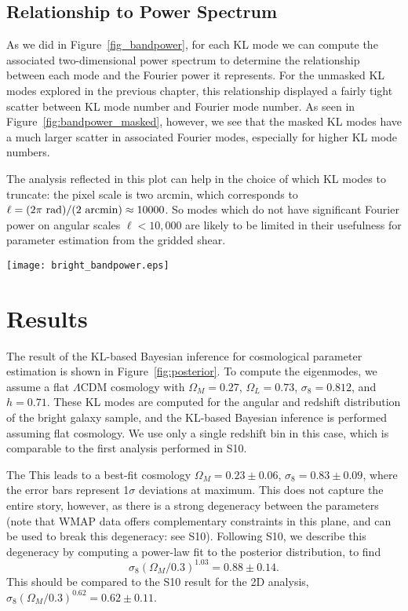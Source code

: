 \subsection{Relationship to Power Spectrum}
As we did in Figure~\ref{fig_bandpower}, for each KL mode we can compute the
associated two-dimensional power spectrum to determine the relationship
between each mode and the Fourier power it represents.  For the unmasked
KL modes explored in the previous chapter, this relationship displayed a
fairly tight scatter between KL mode number and Fourier mode number.
As seen in Figure~\ref{fig:bandpower_masked}, however, we see that the
masked KL modes have a much larger scatter in associated Fourier modes,
especially for higher KL mode numbers.

The analysis reflected in this plot can help in the choice of which KL
modes to truncate: the pixel scale is two arcmin, which corresponds to
$\ell = (2\pi\ {\rm rad}) / (2\ {\rm arcmin}) \approx 10000$.  So modes
which do not have significant Fourier power on angular scales
$\ell < 10,000$ are likely to be limited in their usefulness for parameter
estimation from the gridded shear.

\begin{figure*}
 \centering
 \texttt{[image: bright\_bandpower.eps]}
 \caption{
   The fourier power represented by each KL mode.  For each KL mode number,
   the vertical band shows the distribution of power with angular wavenumber
   $\ell$.  In general, the larger KL modes correspond to larger values of
   $\ell$, though there is a lot of mode mixing.
   \label{fig:bandpower_masked}}
\end{figure*}

\section{Results}
\label{sec:results}
The result of the KL-based Bayesian inference for cosmological parameter
estimation is shown in Figure~\ref{fig:posterior}.  To compute the
eigenmodes, we assume a flat $\Lambda$CDM cosmology with
$\Omega_M = 0.27$, $\Omega_L = 0.73$, $\sigma_8 = 0.812$, and $h=0.71$.
These KL modes are computed for the angular and redshift distribution
of the bright galaxy sample, and the KL-based Bayesian inference is
performed assuming flat cosmology.  We use only a single redshift bin in
this case, which is comparable to the first analysis performed in
S10.

The 
This leads to a best-fit cosmology $\Omega_M = 0.23 \pm 0.06$,
$\sigma_8 = 0.83 \pm 0.09$, where the error bars represent 1$\sigma$
deviations at maximum.
This does not capture the entire story, however, as there
is a strong degeneracy between the parameters (note that WMAP data offers
complementary constraints in this plane, and can be used to break this
degeneracy: see S10).  Following S10, we describe this degeneracy by
computing a power-law fit to the posterior distribution, to find
\begin{equation}
  \sigma_8 (\Omega_M / 0.3) ^ {1.03} = 0.88 \pm 0.14.
\end{equation}
This should be compared to the S10 result for the 2D analysis,
$\sigma_8 (\Omega_M / 0.3) ^ {0.62} = 0.62 \pm 0.11$.

